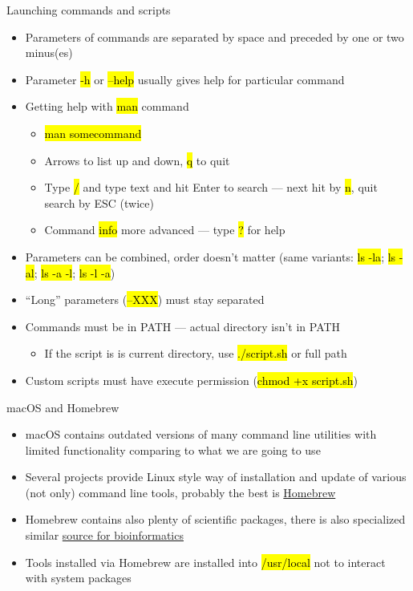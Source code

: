 \documentclass[compress, ucs, xelatex, 11pt, xcolor=svgnames,
  hyperref={
    bookmarks=true,
    unicode=true,
    colorlinks=true,
    pdftitle={Linux, command line and MetaCentrum},
    plainpages=false,
    pdfauthor={Vojtech Zeisek},
    pdfsubject={Course about use of Linux command line, writing shell scripts and using MetaCentrum of CESNET},
    pdfcreator={XeLaTeX},
    pdfkeywords={Linux, GNU, BASH, shell, command line, MetaCentrum},
    linkcolor=DarkRed,
    anchorcolor=DarkBlue,
    citecolor=Indigo,
    filecolor=NavyBlue,
    menucolor=DarkMagenta,
    urlcolor=DarkBlue,
    pdftex},
  url={hyphens, lowtilde} %
  ]{beamer}
\renewcommand{\texttt}[1]{\hl{\ttfamily #1}}
\begin{document}
\begin{frame}{Launching commands and scripts}
  \begin{itemize}
    \item Parameters of commands are separated by space and preceded by one or two minus(es)
    \item Parameter \texttt{-h} or \texttt{--help} usually gives help for particular command
    \item Getting help with \texttt{man} command
    \begin{itemize}
      \item \texttt{man somecommand}
      \item Arrows to list up and down, \texttt{q} to quit
      \item Type \texttt{/} and type text and hit Enter to search --- next hit by \texttt{n}, quit search by ESC (twice)
      \item Command \texttt{info} more advanced --- type \texttt{?} for help
    \end{itemize}
    \item Parameters can be combined, order doesn't matter (same variants: \texttt{ls -la}; \texttt{ls -al}; \texttt{ls -a -l}; \texttt{ls -l -a})
    \item ``Long'' parameters (\texttt{--XXX}) must stay separated
    \item Commands must be in PATH --- actual directory isn't in PATH
    \begin{itemize}
      \item If the script is is current directory, use \texttt{./script.sh} or full path
    \end{itemize}
    \item Custom scripts must have execute permission (\texttt{chmod +x script.sh})
  \end{itemize}
\end{frame}

\begin{frame}{macOS and Homebrew}
  \begin{itemize}
    \item macOS contains outdated versions of many command line utilities with limited functionality comparing to what we are going to use
    \item Several projects provide Linux style way of installation and update of various (not only) command line tools, probably the best is \href{https://brew.sh/}{Homebrew}
    \item Homebrew contains also plenty of scientific packages, there is also specialized similar \href{https://brewsci.github.io/homebrew-bio/}{source for bioinformatics}
    \item Tools installed via Homebrew are installed into \texttt{/usr/local} not to interact with system packages
  \end{itemize}
\end{frame}
\end{document}
